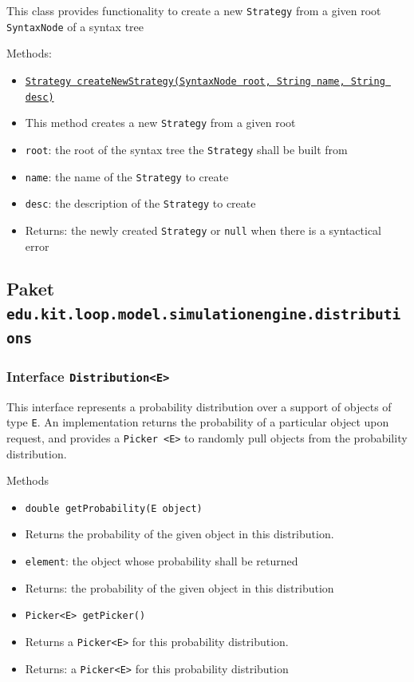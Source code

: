 \documentclass[parskip=full,11pt]{scrartcl}
\begin{document}
This class provides functionality to create a new \texttt{Strategy} from a given root \texttt{SyntaxNode} of a syntax tree

Methods:
\begin{itemize} \itemsep -10pt
	\item \underline{\texttt{Strategy createNewStrategy(SyntaxNode root, String name, String desc)}}
	\item[] This method creates a new \texttt{Strategy} from a given root
	\item[] \texttt{root}: the root of the syntax tree the \texttt{Strategy} shall be built from
	\item[] \texttt{name}: the name of the \texttt{Strategy} to create
	\item[] \texttt{desc}: the description of the \texttt{Strategy} to create
	\item[] Returns: the newly created \texttt{Strategy} or \texttt{null} when there is a syntactical error
\end{itemize}


\subsection{Paket \texttt{edu.kit.loop.model.simulationengine.distributions}}

\subsubsection{Interface \texttt{Distribution<E>}}
This interface represents a probability distribution over a support of objects of type \texttt{E}. An implementation returns the probability of a particular object upon request, and provides a \texttt{Picker <E>} to randomly pull objects from the probability distribution.

Methods
\begin{itemize}\itemsep -10pt
\item \texttt{double getProbability(E object)}
\item[] Returns the probability of the given object in this distribution.
\item[] \texttt{element}: the object whose probability shall be returned
\item[] Returns: the probability of the given object in this distribution

\item \texttt{Picker<E> getPicker()}
\item[] Returns a \texttt{Picker<E>} for this probability distribution.
\item[] Returns: a \texttt{Picker<E>} for this probability distribution
\end{itemize}
\end{document}
